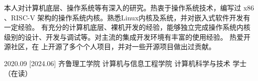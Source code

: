 \documentclass[zh]{resume}
\begin{document}
\makeheader

{\onehalfspacing
\hspace{2em}
本人对计算机底层、操作系统等有深入的研究。热衷于操作系统技术，编写过 x86 、RISC-V 架构的操作系统内核。熟悉Linux内核及系统，并对嵌入式软件开发有一定经验。 
有充分的计算机底层、裸机开发的经验，能够独立完成操作系统内核级别的设计、开发与调试等。对主流的集成开发环境有丰富的使用经验。
热爱开源社区，在 上开源了多个个人项目，并对一些开源项目做出过贡献。
\par}


\begin{competences}[7em]
\end{competences}

\begin{educations}
  \education%
    {2020.09}%
    [2024.06]%
    {齐鲁理工学院}%
    {计算机与信息工程学院}%
    {计算机科学与技术}%
    {学士（在读）}
\end{educations}

\end{document}
